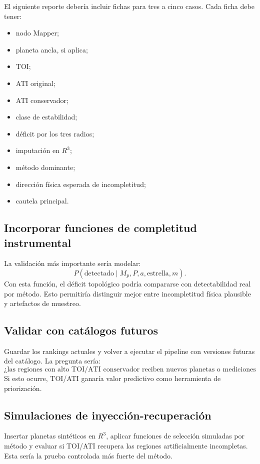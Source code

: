 \documentclass[11pt]{article}
\begin{document}
El siguiente reporte debería incluir fichas para tres a cinco casos. Cada ficha debe tener:
\begin{itemize}
    \item nodo Mapper;
    \item planeta ancla, si aplica;
    \item TOI;
    \item ATI original;
    \item ATI conservador;
    \item clase de estabilidad;
    \item déficit por los tres radios;
    \item imputación en $R^3$;
    \item método dominante;
    \item dirección física esperada de incompletitud;
    \item cautela principal.
\end{itemize}

\subsection{Incorporar funciones de completitud instrumental}

La validación más importante sería modelar:
\[
P(\mathrm{detectado}\mid M_p,P,a,\mathrm{estrella},m).
\]
Con esta función, el déficit topológico podría compararse con detectabilidad real por método. Esto permitiría distinguir mejor entre incompletitud física plausible y artefactos de muestreo.

\subsection{Validar con catálogos futuros}

Guardar los rankings actuales y volver a ejecutar el pipeline con versiones futuras del catálogo. La pregunta sería:
\[
\text{¿las regiones con alto TOI/ATI conservador reciben nuevos planetas o mediciones más completas?}
\]
Si esto ocurre, TOI/ATI ganaría valor predictivo como herramienta de priorización.

\subsection{Simulaciones de inyección-recuperación}

Insertar planetas sintéticos en $R^3$, aplicar funciones de selección simuladas por método y evaluar si TOI/ATI recupera las regiones artificialmente incompletas. Esta sería la prueba controlada más fuerte del método.
\end{document}

